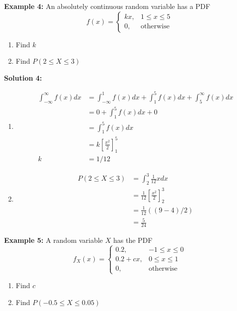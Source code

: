 \documentclass[12pt]{article}
\begin{document}
\textbf{Example 4:} An absolutely continuous random variable has a PDF $$f(x) = \begin{cases}
	kx, & 1 \leq x \leq 5\\
	0, & \text{otherwise}
\end{cases}
$$
\begin{enumerate}
	\item{Find $k$}
	\item{Find $P(2 \leq X \leq 3)$}
\end{enumerate}

\textbf{Solution 4:}
\begin{enumerate}
	\item{
	\begin{align*}
		\int_{-\infty}^{\infty} f(x) dx &= \int_{-\infty}^{1} f(x) dx + \int_{1}^{5} f(x) dx + \int_{5}^{\infty} f(x) dx\\
		&= 0 + \int_{1}^{5} f(x) dx + 0\\
		&= \int_{1}^{5} f(x) dx\\
		&= k[\frac{x^2}{2}]^{5}_{1}\\
		k &= 1/12
	\end{align*}
	}
	\item{
	\begin{align*}
		P(2 \leq X \leq 3) &= \int_{2}^{3} \frac{1}{12}x dx\\
		&= \frac{1}{12}[\frac{x^2}{2}]^{3}_{2}\\
		&= \frac{1}{12}((9-4)/2)\\
		&= \frac{5}{24}
	\end{align*}
	}
\end{enumerate}

\textbf{Example 5:} A random variable $X$ has the PDF 
$$f_X (x) = 
\begin{cases}
	0.2, & -1 \leq x \leq 0\\
	0.2 + cx, & 0 \leq x \leq 1\\
	0, & \text{otherwise}
\end{cases}
$$
\begin{enumerate}
	\item{Find $c$}
	\item{Find $P(-0.5 \leq X \leq 0.05)$}
\end{enumerate}
\end{document}
